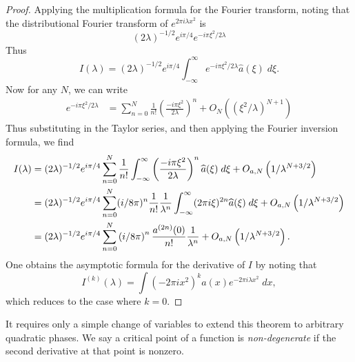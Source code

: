 \begin{proof}
  Applying the multiplication formula for the Fourier transform, noting that the distributional Fourier transform of $e^{2 \pi i \lambda x^2}$ is
  \[ (2 \lambda)^{-1/2} e^{i \pi / 4} e^{- i \pi \xi^2 / 2 \lambda} \]
  Thus
  \[ I(\lambda) = (2 \lambda)^{-1/2} e^{i \pi / 4} \int_{-\infty}^\infty e^{-i \pi \xi^2 / 2 \lambda} \widehat{a}(\xi)\; d\xi. \]
  Now for any $N$, we can write
  \begin{align*}
    e^{-i \pi \xi^2 / 2 \lambda} &= \sum_{n = 0}^N \frac{1}{n!} \left( \frac{- i \pi \xi^2}{2 \lambda} \right)^n + O_N \left( (\xi^2 / \lambda)^{N+1} \right)
  \end{align*}
  Thus substituting in the Taylor series, and then applying the Fourier inversion formula, we find
  \begin{align*}
    I(\lambda) &= (2 \lambda)^{-1/2} e^{i \pi / 4} \sum_{n = 0}^N \frac{1}{n!} \int_{-\infty}^\infty \left( \frac{-i \pi \xi^2}{2 \lambda} \right)^n \widehat{a}(\xi)\; d\xi + O_{a,N} \left( 1/\lambda^{N+3/2} \right)\\
    &= (2 \lambda)^{-1/2} e^{i \pi / 4} \sum_{n = 0}^N (i/8\pi)^n \frac{1}{n!} \frac{1}{\lambda^n} \int_{-\infty}^\infty (2\pi i \xi)^{2n} \widehat{a}(\xi)\; d\xi + O_{a,N} \left( 1 / \lambda^{N+3/2} \right)\\
    &= (2 \lambda)^{-1/2} e^{i \pi / 4} \sum_{n = 0}^N \left( i/8\pi \right)^n \frac{a^{(2n)}(0)}{n!} \frac{1}{\lambda^n} + O_{a,N} \left( 1 / \lambda^{N+3/2} \right). \qedhere
  \end{align*}
  One obtains the asymptotic formula for the derivative of $I$ by noting that
  \[ I^{(k)}(\lambda) = \int (-2 \pi i x^2)^k a(x) e^{-2 \pi i \lambda x^2}\; dx, \]
  which reduces to the case where $k = 0$.
\end{proof}


It requires only a simple change of variables to extend this theorem to arbitrary quadratic phases. We say a critical point of a function is \emph{non-degenerate} if the second derivative at that point is nonzero.

